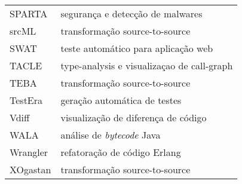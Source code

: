 \begin{table}[h]
{\begin{tabular}{| l | l |}
  SPARTA         & segurança e detecção de malwares     \\
  srcML          & transformação source-to-source       \\
  SWAT           & teste automático para aplicação web  \\
  TACLE          & type-analysis e visualizaçao de call-graph \\
  TEBA           & transformação source-to-source       \\
  TestEra        & geração automática de testes         \\
  Vdiff          & visualização de diferença de código  \\
  WALA           & análise de {\it bytecode} Java       \\
  Wrangler       & refatoração de código Erlang         \\
  XOgastan       & transformação source-to-source       \\
  \hline
\end{tabular}
\label{resumo-softwares}
}
\end{table}

